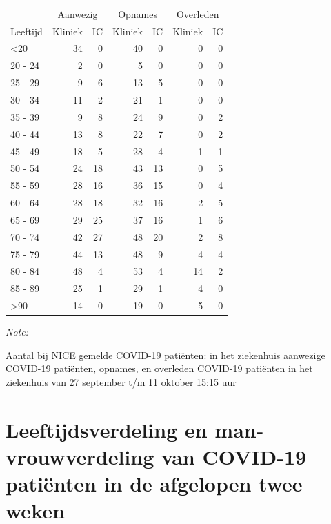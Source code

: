 \documentclass[
  english,
  man,floatsintext]{apa6}
\begin{document}
\begin{table}
\centering\begingroup\fontsize{10}{12}\selectfont

\begin{threeparttable}
\begin{tabular}{lrrrrrr}
\toprule
\multicolumn{1}{c}{ } & \multicolumn{2}{c}{Aanwezig} & \multicolumn{2}{c}{Opnames} & \multicolumn{2}{c}{Overleden} \\
\cmidrule(l{3pt}r{3pt}){2-3} \cmidrule(l{3pt}r{3pt}){4-5} \cmidrule(l{3pt}r{3pt}){6-7}
Leeftijd & Kliniek & IC & Kliniek & IC & Kliniek & IC\\
\midrule
<20 & 34 & 0 & 40 & 0 & 0 & 0\\
20 - 24 & 2 & 0 & 5 & 0 & 0 & 0\\
25 - 29 & 9 & 6 & 13 & 5 & 0 & 0\\
30 - 34 & 11 & 2 & 21 & 1 & 0 & 0\\
35 - 39 & 9 & 8 & 24 & 9 & 0 & 2\\
40 - 44 & 13 & 8 & 22 & 7 & 0 & 2\\
45 - 49 & 18 & 5 & 28 & 4 & 1 & 1\\
50 - 54 & 24 & 18 & 43 & 13 & 0 & 5\\
55 - 59 & 28 & 16 & 36 & 15 & 0 & 4\\
60 - 64 & 28 & 18 & 32 & 16 & 2 & 5\\
65 - 69 & 29 & 25 & 37 & 16 & 1 & 6\\
70 - 74 & 42 & 27 & 48 & 20 & 2 & 8\\
75 - 79 & 44 & 13 & 48 & 9 & 4 & 4\\
80 - 84 & 48 & 4 & 53 & 4 & 14 & 2\\
85 - 89 & 25 & 1 & 29 & 1 & 4 & 0\\
>90 & 14 & 0 & 19 & 0 & 5 & 0\\
\bottomrule
\end{tabular}
\begin{tablenotes}
\item \textit{Note: } 
\item Aantal bij NICE gemelde COVID-19 patiënten: in het ziekenhuis aanwezige COVID-19 patiënten, opnames, en overleden COVID-19 patiënten in het ziekenhuis van 27 september t/m 11 oktober 15:15 uur
\end{tablenotes}
\end{threeparttable}
\endgroup{}
\end{table}

\newpage

\hypertarget{leeftijdsverdeling-en-man-vrouwverdeling-van-covid-19-patiuxebnten-in-de-afgelopen-twee-weken}{%
\section{Leeftijdsverdeling en man-vrouwverdeling van COVID-19 patiënten in de afgelopen twee weken}\label{leeftijdsverdeling-en-man-vrouwverdeling-van-covid-19-patiuxebnten-in-de-afgelopen-twee-weken}}
\end{document}
